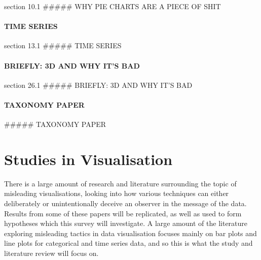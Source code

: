 \documentclass[
  12pt,
]{book}
\begin{document}
\citet{wilke2910} section 10.1 \citet{pie} \#\#\#\#\# WHY PIE CHARTS ARE
A PIECE OF SHIT

\hypertarget{time-series}{%
\paragraph{TIME SERIES}\label{time-series}}

section 13.1 \#\#\#\#\# TIME SERIES

\hypertarget{briefly-3d-and-why-its-bad}{%
\paragraph{BRIEFLY: 3D AND WHY IT'S
BAD}\label{briefly-3d-and-why-its-bad}}

section 26.1 \#\#\#\#\# BRIEFLY: 3D AND WHY IT'S BAD

\hypertarget{taxonomy-paper}{%
\paragraph{TAXONOMY PAPER}\label{taxonomy-paper}}

\citet{taxonomy} \#\#\#\#\# TAXONOMY PAPER

\section{Studies in Visualisation}

There is a large amount of research and literature surrounding the topic
of misleading visualisations, looking into how various techniques can
either deliberately or unintentionally deceive an observer in the
message of the data. Results from some of these papers will be
replicated, as well as used to form hypotheses which this survey will
investigate. A large amount of the literature exploring misleading
tactics in data visualisation focuses mainly on bar plots and line plots
for categorical and time series data, and so this is what the study and
literature review will focus on.
\end{document}
